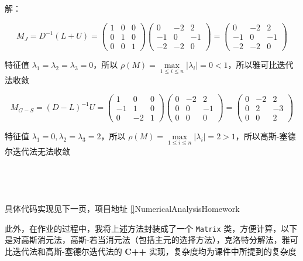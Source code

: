 \documentclass{article}
\begin{document}
\noindent 解：

$$
M_J = D^{-1}(L + U) = 
\begin{pmatrix}
    1& 0 & 0 \\
    0 & 1 & 0 \\
    0 & 0 & 1
\end{pmatrix}
\begin{pmatrix}
    0 & -2 & 2 \\
    -1 & 0 & -1 \\
    -2 & -2 & 0
\end{pmatrix}
=
\begin{pmatrix}
    0 & -2 & 2 \\
    -1 & 0 & -1 \\
    -2 & -2 & 0
\end{pmatrix}
$$

特征值 $\lambda_1 = \lambda_2 = \lambda_3 = 0$，所以 $\rho(M) = \max\limits_{1\leq i\leq n}|\lambda_i| = 0 < 1$，所以雅可比迭代法收敛

$$
M_{G-S} = (D - L)^{-1}U
=
\begin{pmatrix}
    1 & 0 & 0 \\
    -1 & 1 & 0 \\
    0 & -2 & 1
\end{pmatrix}
\begin{pmatrix}
    0 & -2 & 2 \\
    0 & 0 & -1 \\
    0 & 0 & 0
\end{pmatrix}
=
\begin{pmatrix}
    0 & -2 & 2 \\
    0 & 2 & -3 \\
    0 & 0 & 2
\end{pmatrix}
$$

特征值 $\lambda_1 = 0, \lambda_2 = \lambda_3 = 2$，所以 $\rho(M) = \max\limits_{1\leq i\leq n}|\lambda_i| = 2 > 1$，所以高斯-塞德尔迭代法无法收敛 \\ \\ \\ \\ \\

\noindent 具体代码实现见下一页，项目地址 \ref{}{NumericalAnalysisHomework}

\clearpage
此外，在作业的过程中，我将上述方法封装成了一个 \texttt{Matrix} 类，方便计算，以下是对高斯消元法，高斯-若当消元法（包括主元的选择方法），克洛特分解法，雅可比迭代法和高斯-塞德尔迭代法的 \textbf{C++} 实现，复杂度均为课件中所提到的复杂度
\end{document}
